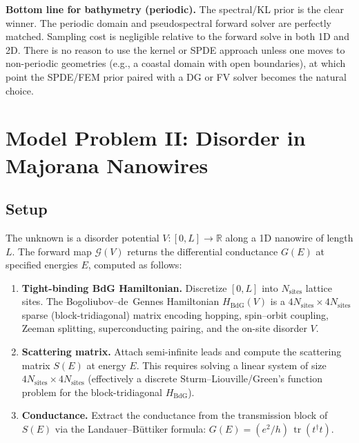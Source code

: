 \documentclass[11pt]{article}
\newcommand{\R}{\mathbb{R}}
\DeclareMathOperator{\tr}{tr}
\begin{document}
\medskip\noindent\textbf{Bottom line for bathymetry (periodic).}  The spectral/KL prior is the clear winner.  The periodic domain and pseudospectral forward solver are perfectly matched.  Sampling cost is negligible relative to the forward solve in both 1D and 2D.  There is no reason to use the kernel or SPDE approach unless one moves to non-periodic geometries (e.g., a coastal domain with open boundaries), at which point the SPDE/FEM prior paired with a DG or FV solver becomes the natural choice.


\section{Model Problem II: Disorder in Majorana Nanowires}\label{sec:BdG}

\subsection{Setup}

The unknown is a disorder potential $V: [0, L] \to \R$ along a 1D nanowire of length $L$.  The forward map $\mathcal{G}(V)$ returns the differential conductance $G(E)$ at specified energies $E$, computed as follows:
\begin{enumerate}[nosep]
  \item \textbf{Tight-binding BdG Hamiltonian.}  Discretize $[0,L]$ into $N_{\text{sites}}$ lattice sites.  The Bogoliubov--de~Gennes Hamiltonian $H_{\text{BdG}}(V)$ is a $4N_{\text{sites}} \times 4N_{\text{sites}}$ sparse (block-tridiagonal) matrix encoding hopping, spin--orbit coupling, Zeeman splitting, superconducting pairing, and the on-site disorder $V$.
  \item \textbf{Scattering matrix.}  Attach semi-infinite leads and compute the scattering matrix $S(E)$ at energy $E$.  This requires solving a linear system of size $4N_{\text{sites}} \times 4N_{\text{sites}}$ (effectively a discrete Sturm--Liouville/Green's function problem for the block-tridiagonal $H_{\text{BdG}}$).
  \item \textbf{Conductance.}  Extract the conductance from the transmission block of $S(E)$ via the Landauer--B\"uttiker formula: $G(E) = (e^2/h)\, \tr(t^\dagger t)$.
\end{enumerate}
\end{document}
